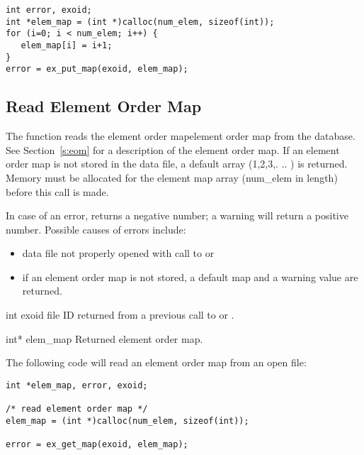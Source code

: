 \begin{lstlisting}
int error, exoid;
int *elem_map = (int *)calloc(num_elem, sizeof(int));
for (i=0; i < num_elem; i++) {
   elem_map[i] = i+1;
}
error = ex_put_map(exoid, elem_map);
\end{lstlisting}

\subsection{Read Element Order Map}

The function  reads the element order mapelement
order map from the database. See Section~\ref{s:eom} for a description
of the element order map. If an element order map is not stored in the
data file, a default array (1,2,3,. .. ) is
returned. Memory must be allocated for the element map array
({num_elem} in length) before this call is made.

In case of an error,  returns a negative number; a
warning will return a positive number. Possible causes of errors
include:
\begin{itemize}
 \item data file not properly opened with call to 
 or 

 \item if an element order map is not stored, a default map and a
 warning value are returned.
\end{itemize}


\begin{parameters}
\item[{int exoid \R{}}]
\exo{} file ID returned from a previous call to  or
.

\item[{int* elem_map \W{}}]
Returned element order map.
\end{parameters}

The following code will read an element order map from an
open \exo{} file:

\begin{lstlisting}
int *elem_map, error, exoid;

/* read element order map */
elem_map = (int *)calloc(num_elem, sizeof(int));

error = ex_get_map(exoid, elem_map);
\end{lstlisting}

